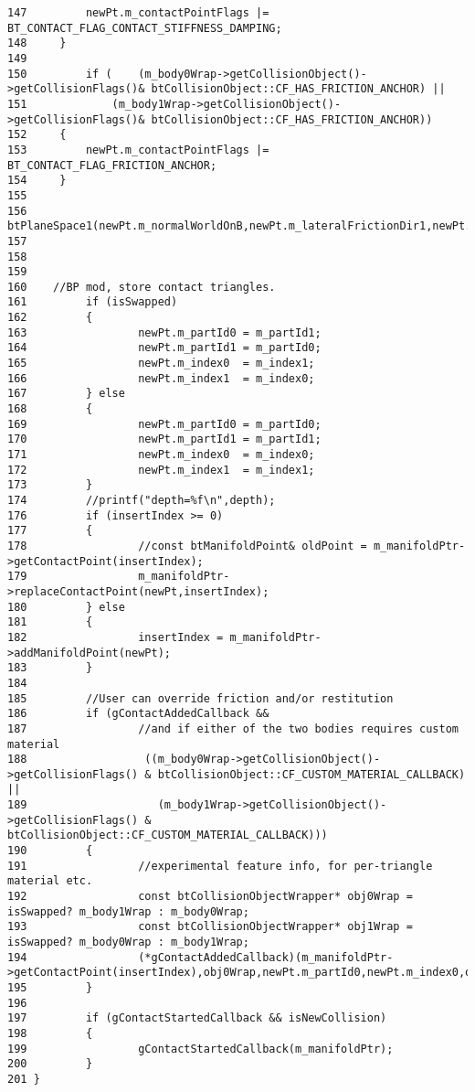 \begin{Code}
\begin{verbatim}
147         newPt.m_contactPointFlags |= BT_CONTACT_FLAG_CONTACT_STIFFNESS_DAMPING;
148     }
149 
150         if (    (m_body0Wrap->getCollisionObject()->getCollisionFlags()& btCollisionObject::CF_HAS_FRICTION_ANCHOR) ||
151             (m_body1Wrap->getCollisionObject()->getCollisionFlags()& btCollisionObject::CF_HAS_FRICTION_ANCHOR))
152     {
153         newPt.m_contactPointFlags |= BT_CONTACT_FLAG_FRICTION_ANCHOR;
154     }
155 
156         btPlaneSpace1(newPt.m_normalWorldOnB,newPt.m_lateralFrictionDir1,newPt.m_lateralFrictionDir2);
157         
158 
159         
160    //BP mod, store contact triangles.
161         if (isSwapped)
162         {
163                 newPt.m_partId0 = m_partId1;
164                 newPt.m_partId1 = m_partId0;
165                 newPt.m_index0  = m_index1;
166                 newPt.m_index1  = m_index0;
167         } else
168         {
169                 newPt.m_partId0 = m_partId0;
170                 newPt.m_partId1 = m_partId1;
171                 newPt.m_index0  = m_index0;
172                 newPt.m_index1  = m_index1;
173         }
174         //printf("depth=%f\n",depth);
176         if (insertIndex >= 0)
177         {
178                 //const btManifoldPoint& oldPoint = m_manifoldPtr->getContactPoint(insertIndex);
179                 m_manifoldPtr->replaceContactPoint(newPt,insertIndex);
180         } else
181         {
182                 insertIndex = m_manifoldPtr->addManifoldPoint(newPt);
183         }
184         
185         //User can override friction and/or restitution
186         if (gContactAddedCallback &&
187                 //and if either of the two bodies requires custom material
188                  ((m_body0Wrap->getCollisionObject()->getCollisionFlags() & btCollisionObject::CF_CUSTOM_MATERIAL_CALLBACK) ||
189                    (m_body1Wrap->getCollisionObject()->getCollisionFlags() & btCollisionObject::CF_CUSTOM_MATERIAL_CALLBACK)))
190         {
191                 //experimental feature info, for per-triangle material etc.
192                 const btCollisionObjectWrapper* obj0Wrap = isSwapped? m_body1Wrap : m_body0Wrap;
193                 const btCollisionObjectWrapper* obj1Wrap = isSwapped? m_body0Wrap : m_body1Wrap;
194                 (*gContactAddedCallback)(m_manifoldPtr->getContactPoint(insertIndex),obj0Wrap,newPt.m_partId0,newPt.m_index0,obj1Wrap,newPt.m_partId1,newPt.m_index1);
195         }
196 
197         if (gContactStartedCallback && isNewCollision)
198         {
199                 gContactStartedCallback(m_manifoldPtr);
200         }
201 }
\end{verbatim}
\end{Code}




